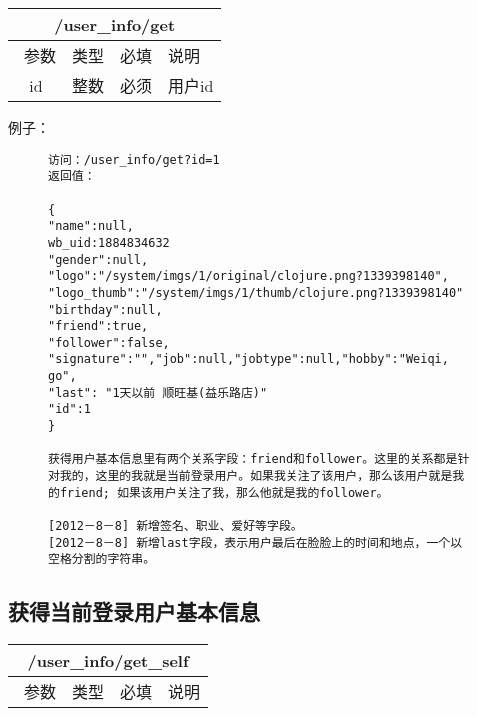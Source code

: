 \documentclass[cs4size]{ctexartutf8}
\begin{document}
\begin{table}[H]
   \begin{center}
\begin{tabular}{|c|c|c|p{12cm}|}
\hline
\multicolumn{4}{|c|}{/user\_info/get} \\
\hline\hline
 \  参数  & 类型 & 必填 &  说明  \\
\hline
 id  & 整数 & 必须 &  用户id\\
\hline
\end{tabular}
   \end{center}
\end{table}



例子：

\begin{figure}[H]
\begin{verbatim}
访问：/user_info/get?id=1
返回值：

{
"name":null,
wb_uid:1884834632
"gender":null,
"logo":"/system/imgs/1/original/clojure.png?1339398140",
"logo_thumb":"/system/imgs/1/thumb/clojure.png?1339398140"
"birthday":null,
"friend":true,
"follower":false,
"signature":"","job":null,"jobtype":null,"hobby":"Weiqi, go",
"last": "1天以前 顺旺基(益乐路店)" 
"id":1
}

获得用户基本信息里有两个关系字段：friend和follower。这里的关系都是针对我的，这里的我就是当前登录用户。如果我关注了该用户，那么该用户就是我的friend; 如果该用户关注了我，那么他就是我的follower。

[2012－8－8] 新增签名、职业、爱好等字段。
[2012－8－8] 新增last字段，表示用户最后在脸脸上的时间和地点，一个以空格分割的字符串。

\end{verbatim}
\end{figure}



\subsection{获得当前登录用户基本信息}

\begin{table}[H]
   \begin{center}
\begin{tabular}{|c|c|c|p{12cm}|}
\hline
\multicolumn{4}{|c|}{/user\_info/get\_self} \\
\hline\hline
 \  参数  & 类型 & 必填 &  说明  \\
\hline
\end{tabular}
   \end{center}
\end{table}
\end{document}
